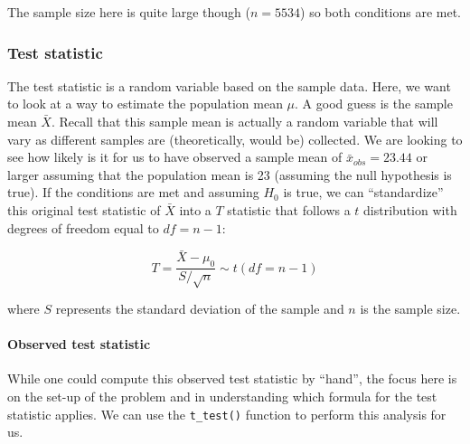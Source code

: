 \documentclass[12pt, krantz2,]{krantz}
\makeatletter
\newenvironment{Shaded}{\begin{snugshade}}{\end{snugshade}}
\newcommand{\DataTypeTok}[1]{\textcolor[rgb]{0.27,0.27,0.27}{#1}}
\newcommand{\DecValTok}[1]{\textcolor[rgb]{0.06,0.06,0.06}{#1}}
\newcommand{\KeywordTok}[1]{\textcolor[rgb]{0.27,0.27,0.27}{\textbf{#1}}}
\newcommand{\NormalTok}[1]{#1}
\newcommand{\OperatorTok}[1]{\textcolor[rgb]{0.43,0.43,0.43}{\textbf{#1}}}
\newcommand{\OtherTok}[1]{\textcolor[rgb]{0.37,0.37,0.37}{#1}}
\newcommand{\StringTok}[1]{\textcolor[rgb]{0.5,0.5,0.5}{#1}}
\let\oldparagraph\paragraph
\renewcommand{\paragraph}[1]{\oldparagraph{#1}\mbox{}}
\newenvironment{kframe}{%
\medskip{}
\setlength{\fboxsep}{.8em}
 \def\at@end@of@kframe{}%
 \ifinner\ifhmode%
  \def\at@end@of@kframe{\end{minipage}}%
  \begin{minipage}{\columnwidth}%
 \fi\fi%
 \def\FrameCommand##1{\hskip\@totalleftmargin \hskip-\fboxsep
 \colorbox{shadecolor}{##1}\hskip-\fboxsep
     \hskip-\linewidth \hskip-\@totalleftmargin \hskip\columnwidth}%
 \MakeFramed {\advance\hsize-\width
   \@totalleftmargin\z@ \linewidth\hsize
   \@setminipage}}%
 {\par\unskip\endMakeFramed%
 \at@end@of@kframe}
\renewenvironment{Shaded}{\begin{kframe}}{\end{kframe}}
\makeatother
\begin{document}
The sample size here is quite large though (\(n = 5534\)) so both conditions are met.

\hypertarget{test-statistic}{%
\subsubsection*{Test statistic}\label{test-statistic}}


The test statistic is a random variable based on the sample data. Here, we want to look at a way to estimate the population mean \(\mu\). A good guess is the sample mean \(\bar{X}\). Recall that this sample mean is actually a random variable that will vary as different samples are (theoretically, would be) collected. We are looking to see how likely is it for us to have observed a sample mean of \(\bar{x}_{obs} = 23.44\) or larger assuming that the population mean is 23 (assuming the null hypothesis is true). If the conditions are met and assuming \(H_0\) is true, we can ``standardize'' this original test statistic of \(\bar{X}\) into a \(T\) statistic that follows a \(t\) distribution with degrees of freedom equal to \(df = n - 1\):

\[ T =\dfrac{ \bar{X} - \mu_0}{ S / \sqrt{n} } \sim t (df = n - 1) \]

where \(S\) represents the standard deviation of the sample and \(n\) is the sample size.

\hypertarget{observed-test-statistic}{%
\paragraph{Observed test statistic}\label{observed-test-statistic}}

While one could compute this observed test statistic by ``hand'', the focus here is on the set-up of the problem and in understanding which formula for the test statistic applies. We can use the \texttt{t\_test()} function to perform this analysis for us.

\begin{Shaded}
\end{Shaded}
\end{document}
